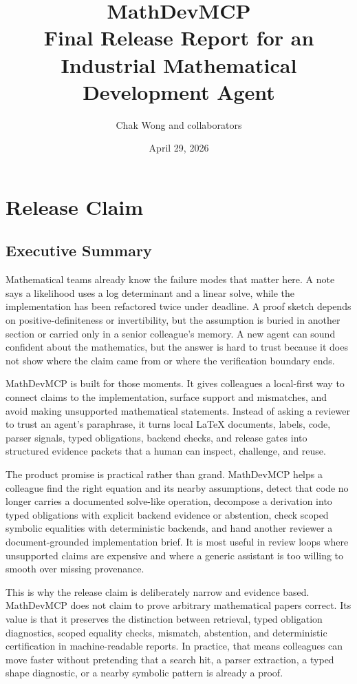 \documentclass[12pt,a4paper,openany]{book}
\title{\Huge\textbf{MathDevMCP}\\[10pt]
  \Large Final Release Report for an Industrial Mathematical Development Agent}
\author{Chak Wong and collaborators}
\date{April 29, 2026}
\begin{document}
\frontmatter
\maketitle
\tableofcontents

\mainmatter

\part{Release Claim}

\chapter{Executive Summary}

Mathematical teams already know the failure modes that matter here. A note says a
likelihood uses a log determinant and a linear solve, while the implementation
has been refactored twice under deadline. A proof sketch depends on
positive-definiteness or invertibility, but the assumption is buried in another
section or carried only in a senior colleague's memory. A new agent can sound
confident about the mathematics, but the answer is hard to trust because it does
not show where the claim came from or where the verification boundary ends.

MathDevMCP is built for those moments. It gives colleagues a local-first way to
connect claims to the implementation, surface support and mismatches, and avoid
making unsupported mathematical statements. Instead of asking a reviewer to trust
an agent's paraphrase, it turns local LaTeX documents, labels, code, parser
signals, typed obligations, backend checks, and release gates into structured
evidence packets that a human can inspect, challenge, and reuse.

The product promise is practical rather than grand. MathDevMCP helps a colleague
find the right equation and its nearby assumptions, detect that code no longer
carries a documented solve-like operation, decompose a derivation into typed
obligations with explicit backend evidence or abstention, check scoped symbolic
equalities with deterministic backends, and hand another reviewer a
document-grounded implementation brief.
It is most useful in review loops where unsupported claims are expensive and
where a generic assistant is too willing to smooth over missing provenance.

This is why the release claim is deliberately narrow and evidence based.
MathDevMCP does not claim to prove arbitrary mathematical papers correct. Its
value is that it preserves the distinction between retrieval, typed obligation
diagnostics, scoped equality checks, mismatch, abstention, and deterministic
certification in machine-readable reports. In practice, that means colleagues can
move faster without pretending that a search hit, a parser extraction, a typed
shape diagnostic, or a nearby symbolic pattern is already a proof.
\end{document}

